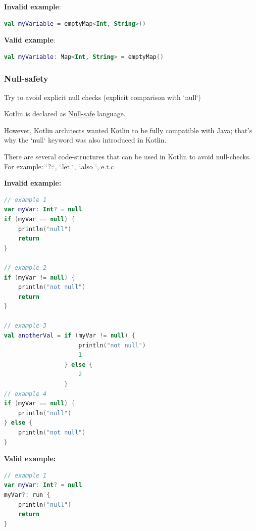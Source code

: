 {{{{\textbf{Invalid example}:

\begin{lstlisting}[language=Kotlin]
val myVariable = emptyMap<Int, String>() 
\end{lstlisting}


\textbf{Valid example}:

\begin{lstlisting}[language=Kotlin]
val myVariable: Map<Int, String> = emptyMap() 
\end{lstlisting}


\subsubsection*{\textbf{Null-safety}}
\leavevmode\newline



Try to avoid explicit null checks (explicit comparison with `null`) 

Kotlin is declared as \href{https://kotlinlang.org/docs/reference/null-safety.html}{Null-safe} language.

However, Kotlin architects wanted Kotlin to be fully compatible with Java; that's why the `null` keyword was also introduced in Kotlin. 



There are several code-structures that can be used in Kotlin to avoid null-checks. For example: `?:`,  `.let {}`, `.also {}`, e.t.c



\textbf{Invalid example:}

\begin{lstlisting}[language=Kotlin]
// example 1
var myVar: Int? = null
if (myVar == null) {
    println("null")
    return
}

// example 2
if (myVar != null) {
    println("not null")
    return
}

// example 3
val anotherVal = if (myVar != null) {
                     println("not null")
                     1
                 } else {
                     2
                 }
// example 4
if (myVar == null) {
    println("null")
} else {
    println("not null")
}
\end{lstlisting}


\textbf{Valid example:}

\begin{lstlisting}[language=Kotlin]
// example 1
var myVar: Int? = null
myVar?: run {
    println("null")
    return
}


\end{lstlisting}}}}}
